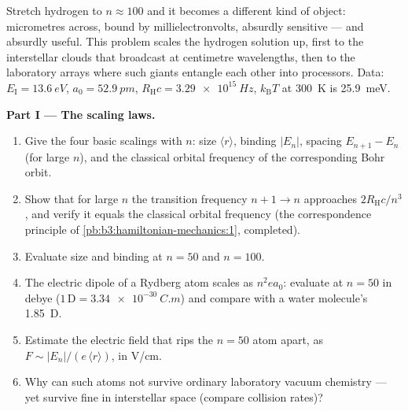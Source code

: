 \begin{problem}\label{pb:b3:hydrogen-atom:1}
Stretch hydrogen to $n \approx 100$ and it becomes a different kind
of object: micrometres across, bound by millielectronvolts,
absurdly sensitive --- and absurdly useful. This problem scales the
hydrogen solution up, first to the interstellar clouds that
broadcast at centimetre wavelengths, then to the laboratory arrays
where such giants entangle each other into processors. Data:
$E_{\text{I}} = \qty{13.6}{eV}$, $a_0 = \qty{52.9}{pm}$,
$R_{\text{H}}c = \qty{3.29e15}{Hz}$, $k_{\text{B}}T$ at
\qty{300}{K} is \qty{25.9}{meV}.

\medskip\noindent\textbf{Part I --- The scaling laws.}
\begin{enumerate}
  \item Give the four basic scalings with $n$: size $\langle
        r\rangle$, binding $|E_n|$, spacing $E_{n+1} - E_n$ (for
        large $n$), and the classical orbital frequency of the
        corresponding Bohr orbit.
  \item Show that for large $n$ the transition frequency $n+1 \to
        n$ approaches $2R_{\text{H}}c/n^3$, and verify it equals
        the classical orbital frequency (the correspondence
        principle of \cref{pb:b3:hamiltonian-mechanics:1},
        completed).
  \item Evaluate size and binding at $n = 50$ and $n = 100$.
  \item The electric dipole of a Rydberg atom scales as $n^2ea_0$:
        evaluate at $n = 50$ in debye ($1\,\text{D} =
        \qty{3.34e-30}{C.m}$) and compare with a water molecule's
        \qty{1.85}{D}.
  \item Estimate the electric field that rips the $n = 50$ atom
        apart, as $F \sim |E_n|/(e\,\langle r\rangle)$, in V/cm.
  \item Why can such atoms not survive ordinary laboratory vacuum
        chemistry --- yet survive fine in interstellar space
        (compare collision rates)?
\end{enumerate}


\end{problem}
